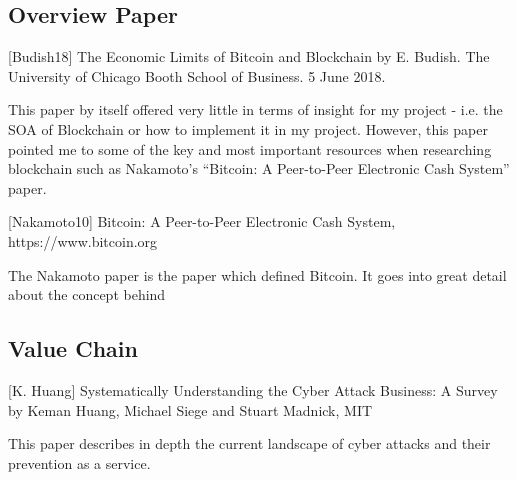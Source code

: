 \subsection{Overview Paper}
[Budish18]  The Economic Limits of Bitcoin and Blockchain by E. Budish. The University of Chicago Booth School of Business. 5 June 2018.


This paper by itself offered very little in terms of insight for my project - i.e. the SOA of Blockchain or how to implement it in my project. However, this paper pointed me to some of the key and most important resources when researching blockchain such as Nakamoto’s “Bitcoin: A Peer-to-Peer Electronic Cash System” paper. 

[Nakamoto10] Bitcoin: A Peer-to-Peer Electronic Cash System, https://www.bitcoin.org

The Nakamoto paper is the paper which defined Bitcoin. It goes into great detail about the concept behind 

\subsection{Value Chain}
[K. Huang] Systematically Understanding the Cyber Attack Business: A Survey by Keman Huang, Michael Siege and Stuart Madnick, MIT 

This paper describes in depth the current landscape of cyber attacks and their prevention as a service. 

